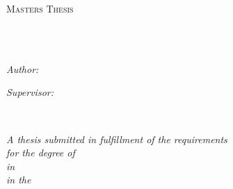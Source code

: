 \documentclass[
11pt, %
oneside, %
english, %
singlespacing, %
headsepline, %
]{style} %
\author{Andre M M \textsc{Faria}} %
\begin{document}
\frontmatter %

\pagestyle{plain} %


\begin{titlepage}
	\begin{center}

		\vspace*{.06\textheight}
		{\scshape\LARGE \univname\par}\vspace{1.5cm} %
		\textsc{\Large Masters Thesis}\\[0.5cm] %

		\HRule \\[0.4cm] %
		{\huge \bfseries \ttitle\par}\vspace{0.4cm} %
		\HRule \\[1.5cm] %

		\begin{minipage}[t]{0.4\textwidth}
			\begin{flushleft} \large
				\emph{Author:}\\
				\href{https://www.linkedin.com/in/andremmfaria/}{\authorname} %
			\end{flushleft}
		\end{minipage}
		\begin{minipage}[t]{0.4\textwidth}
			\begin{flushright} \large
				\emph{Supervisor:} \\
				\href{https://www.tudublin.ie/explore/faculties-and-schools/computing-digital-data/informatics-and-cybersecurity/people/academic-staff/robertsmith.php}{\supname} %
			\end{flushright}
		\end{minipage}\\[2cm]

		\vfill

		\large \textit{A thesis submitted in fulfillment of the requirements\\ for the degree of \degreename\\ in \subjectname}\\[0.4cm] %
		\textit{in the}\\[0.4cm]
		\deptname\\[2cm] %


\end{center}
\end{titlepage}
\end{document}
